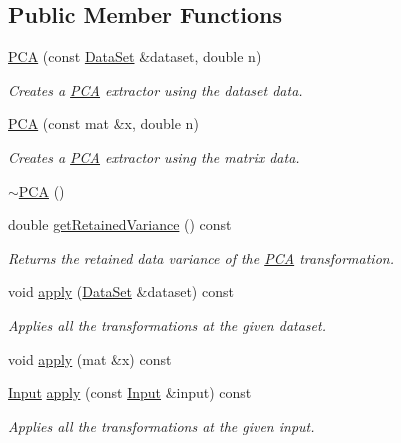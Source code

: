 \subsection*{Public Member Functions}
\begin{DoxyCompactItemize}
\item 
\hyperlink{classhappyml_1_1PCA_a20ccc8033fb2addfe1607f12137e8c7a}{P\+CA} (const \hyperlink{classhappyml_1_1DataSet}{Data\+Set} \&dataset, double n)
\begin{DoxyCompactList}\small\item\em Creates a \hyperlink{classhappyml_1_1PCA}{P\+CA} extractor using the dataset data. \end{DoxyCompactList}\item 
\hyperlink{classhappyml_1_1PCA_aa03c90a06460ad6d76b7516454d709ec}{P\+CA} (const mat \&x, double n)
\begin{DoxyCompactList}\small\item\em Creates a \hyperlink{classhappyml_1_1PCA}{P\+CA} extractor using the matrix data. \end{DoxyCompactList}\item 
\hyperlink{classhappyml_1_1PCA_a10d3820f23ccde93ef029846ae1dd418}{$\sim$\+P\+CA} ()
\item 
double \hyperlink{classhappyml_1_1PCA_afec8e7b4f8bb8cbe6bd460fb278017a6}{get\+Retained\+Variance} () const 
\begin{DoxyCompactList}\small\item\em Returns the retained data variance of the \hyperlink{classhappyml_1_1PCA}{P\+CA} transformation. \end{DoxyCompactList}\item 
void \hyperlink{classhappyml_1_1PCA_a298495b3f3cf0ed3b623392a6f89b719}{apply} (\hyperlink{classhappyml_1_1DataSet}{Data\+Set} \&dataset) const 
\begin{DoxyCompactList}\small\item\em Applies all the transformations at the given dataset. \end{DoxyCompactList}\item 
void \hyperlink{classhappyml_1_1PCA_a3ac3cbbf12595272526b126ba2107d8e}{apply} (mat \&x) const 
\item 
\hyperlink{namespacehappyml_a03602d1ec49393790b8a0449f40cd01f}{Input} \hyperlink{classhappyml_1_1PCA_a2a630892c653832287bb3df4ab002d51}{apply} (const \hyperlink{namespacehappyml_a03602d1ec49393790b8a0449f40cd01f}{Input} \&input) const 
\begin{DoxyCompactList}\small\item\em Applies all the transformations at the given input. \end{DoxyCompactList}\end{DoxyCompactItemize}
